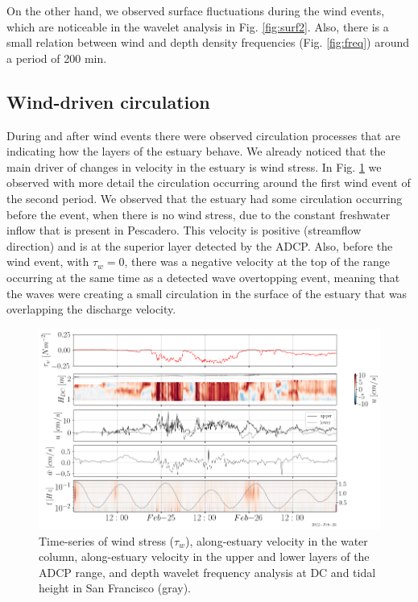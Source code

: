 \documentclass[tesis.tex]{subfiles}
\begin{document}
On the other hand, we observed surface fluctuations during the wind events, which are noticeable in the wavelet analysis in Fig. \ref{fig:surf2}. Also, there is a small relation between wind and depth density frequencies (Fig. \ref{fig:freq}) around a period of 200 min.\\

\subsection{Wind-driven circulation}

During and after wind events there were observed circulation processes that are indicating how the layers of the estuary behave. We already noticed that the main driver of changes in velocity in the estuary is wind stress. In Fig. \ref{fig:velwind} we observed with more detail the circulation occurring around the first wind event of the second period. We observed that the estuary had some circulation occurring before the event, when there is no wind stress, due to the constant freshwater inflow that is present in Pescadero. This velocity is positive (streamflow direction) and is at the superior layer detected by the ADCP. Also, before the wind event, with $\tau_w =0$, there was a negative velocity at the top of the range occurring at the same time as a detected wave overtopping event, meaning that the waves were creating a small circulation in the surface of the estuary that was overlapping the discharge velocity.\\

\begin{figure}[h!]
    \centering
    \includegraphics[width=\textwidth]{Imagenes/vel_wind.png}
    \caption{Time-series of wind stress ($\tau_w$), along-estuary velocity in the water column, along-estuary velocity in the upper and lower layers of the ADCP range, and depth wavelet frequency analysis at DC and tidal height in San Francisco (gray). }
    \label{fig:velwind}
\end{figure}
\end{document}
